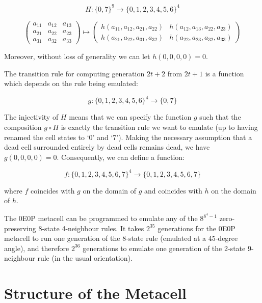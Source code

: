 $$ H : \{ 0, 7 \}^9 \rightarrow \{ 0, 1, 2, 3, 4, 5, 6 \}^4 $$


$$ \begin{pmatrix}
a_{11} & a_{12} & a_{13} \\
a_{21} & a_{22} & a_{23} \\
a_{31} & a_{32} & a_{33}
\end{pmatrix} \mapsto \begin{pmatrix}
h(a_{11}, a_{12}, a_{21}, a_{22}) & h(a_{12}, a_{13}, a_{22}, a_{23}) \\
h(a_{21}, a_{22}, a_{31}, a_{32}) & h(a_{22}, a_{23}, a_{32}, a_{33})
\end{pmatrix} $$

Moreover, without loss of generality we can let $h(0, 0, 0, 0) = 0$.

The transition rule for computing generation $2t + 2$ from $2t + 1$ is a
function which depends on the rule being emulated:

$$ g : \{ 0, 1, 2, 3, 4, 5, 6 \}^4 \rightarrow \{ 0, 7 \} $$

The injectivity of $H$ means that we can specify the function $g$
such that the composition $g \circ H$ is exactly the transition rule
we want to emulate (up to having renamed the cell states to `0' and `7').
Making the necessary assumption that a dead cell surrounded entirely by
dead cells remains dead, we have $g(0, 0, 0, 0) = 0$. Consequently, we
can define a function:

$$ f : \{ 0, 1, 2, 3, 4, 5, 6, 7 \}^4 \rightarrow
\{0, 1, 2, 3, 4, 5, 6, 7 \} $$

where $f$ coincides with $g$ on the domain of $g$ and coincides with $h$
on the domain of $h$.


The 0E0P metacell can be programmed to emulate any of the $8^{8^4-1}$
zero-preserving 8-state 4-neighbour rules. It takes $2^{35}$ generations
for the 0E0P metacell to run one generation of the 8-state rule (emulated
at a 45-degree angle), and therefore $2^{36}$ generations to emulate one
generation of the 2-state 9-neighbour rule (in the usual orientation).

\section{Structure of the Metacell}

